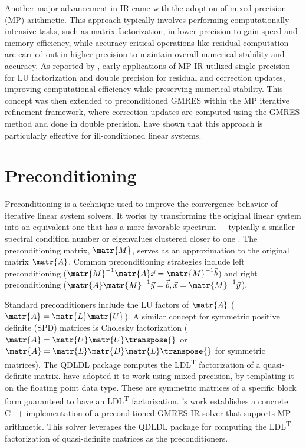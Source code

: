 Another major advancement in IR came with the adoption of mixed-precision (MP)
arithmetic. This approach typically involves performing computationally
intensive tasks, such as matrix factorization, in lower precision to gain speed
and memory efficiency, while accuracy-critical operations like residual
computation are carried out in higher precision to maintain overall numerical
stability and accuracy. As reported by \textcite{wong_exploring_2024}, early
applications of MP IR utilized single precision for LU factorization and double
precision for residual and correction updates, improving computational
efficiency while preserving numerical stability. This concept was then extended
to preconditioned GMRES within the MP iterative refinement framework, where
correction updates are computed using the GMRES method and done in double
precision. \textcite{lindquist_improving_2020} have shown that this approach is
particularly effective for ill-conditioned linear systems.

\section{Preconditioning}
\label{sec:preconditioning}

Preconditioning is a technique used to improve the convergence behavior of
iterative linear system solvers. It works by transforming the original linear
system into an equivalent one that has a more favorable spectrum—--typically a
smaller spectral condition number or eigenvalues clustered closer to one
\cite[p.~187]{ascher_first_2011}. The preconditioning matrix, \(\matr{M}\),
serves as an approximation to the original matrix \(\matr{A}\). Common
preconditioning strategies include left preconditioning (\(\matr{M}^{-1}
\matr{A} \vec{x} = \matr{M}^{-1} \vec{b}\)) and right preconditioning
(\(\matr{A} \matr{M}^{-1} \vec{y} = \vec{b}, \vec{x} = \matr{M}^{-1} \vec{y}\)).

Standard preconditioners include the LU factors of \(\matr{A}\) (\(\matr{A} =
\matr{L} \matr{U}\)). A similar concept for symmetric positive definite (SPD)
matrices is Cholesky factorization (\(\matr{A} = \matr{U} \matr{U}\transpose{}\)
or \(\matr{A} = \matr{L} \matr{D} \matr{L}\transpose{}\) for symmetric
matrices). The QDLDL package \cite{stellato_osqp_2020} computes the
LDL\textsuperscript{T} factorization of a quasi-definite matrix.
\textcite{shahrooz_derakhshan_using_2023} have adopted it to work using mixed
precision, by templating it on the floating point data type. These are symmetric
matrices of a specific block form guaranteed to have an LDL\textsuperscript{T}
factorization. \textcite{wong_exploring_2024}'s work establishes a concrete C++
implementation of a preconditioned GMRES-IR solver that supports MP arithmetic.
This solver leverages the QDLDL package for computing the LDL\textsuperscript{T}
factorization of quasi-definite matrices as the preconditioners.

